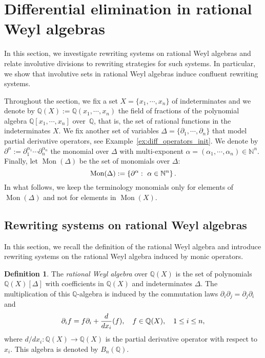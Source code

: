 \documentclass[10pt]{easychair}
\theoremstyle{definition}
\newtheorem{definition}[theorem]{Definition}
\newcommand\diff[1]{\partial_{#1}}
\newcommand\Q{\mathbb{Q}}
\newcommand\N{\mathbb{N}}
\newcommand\QX{\mathbb{Q}[x_1,\cdots,x_n]}
\newcommand\QXX{\mathbb{Q}(x_1,\cdots,x_n)}
\newcommand\Weyl[1]{B_{#1}(\Q)}
\newcommand\monBasis{\Mon(\Delta)}
\DeclareMathOperator{\Mon}{Mon}
\begin{document}
\section{Differential elimination in rational Weyl algebras}
\label{sec:differential_elimination_in_rational_Weyl_algebras}

In this section, we investigate rewriting systems on rational Weyl
algebras and relate involutive divisions to rewriting strategies for such
systems. In particular, we show that involutive sets in rational Weyl
algebras induce confluent rewriting systems.
\medskip

Throughout the section, we fix a set $X=\{x_1,\cdots,x_n\}$ of
indeterminates and we denote by $\Q(X):=\QXX$ the field of fractions of
the polynomial algebra $\QX$ over~$\Q$, that is, the set of rational
functions in the indeterminates $X$. We fix another set of variables
$\Delta=\{\diff{1},\cdots,\diff{n}\}$ that model partial derivative
operators, see Example~\ref{ex:diff_operators_init}. We denote by
$\partial^{\alpha}:=\diff{1}^{\alpha_1}\cdots\diff{n}^{\alpha_n}$ the
monomial over $\Delta$ with multi-exponent
$\alpha=(\alpha_1,\cdots,\alpha_n)\in\N^n$. Finally, let $\monBasis$ be
the set of monomials over $\Delta$:
\[\monBasis:=\left\{\partial^\alpha:\ \alpha\in\N^n\right\}.
\smallskip\]
In what follows, we keep the terminology monomials only for elements of
$\Mon(\Delta)$ and not for elements in $\Mon(X)$.

\subsection{Rewriting systems on rational Weyl algebras}
\label{sec:rewriting_systems_on_Weyl_algebras}

In this section, we recall the definition of the rational Weyl algebra
and introduce rewriting systems on the rational Weyl algebra induced by
monic operators.
\medskip

\begin{definition}
  The {\it rational Weyl algebra} over $\Q(X)$ is the set of polynomials
  $\Q(X)[\Delta]$ with coefficients in $\Q(X)$ and indeterminates
  $\Delta$. The multiplication of this $\mathbb Q$-algebra is induced by
  the commutation laws $\partial_i\partial_j=\partial_j\partial_i$ and
  \[\diff{i}f=f\diff{i}+\frac{d}{dx_i}(f),\quad f\in\Q(X),\quad
  1\leq i\leq n,
  \smallskip\]
  where $d/dx_i:\Q(X)\to\Q(X)$ is the partial derivative operator with
  respect to~$x_i$. This algebra is denoted by $\Weyl{n}$.
\end{definition}
\smallskip
\end{document}

